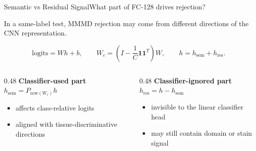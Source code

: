 \documentclass[aspectratio=169,10pt]{beamer}
\begin{document}
\begin{frame}{Semantic vs Residual Signal}{What part of FC-128 drives rejection?}

\vspace{0.02cm}

{\normalsize
In a same-label test, MMMD rejection may come from different directions of the CNN representation.
}

\vspace{-0.12cm}

\begin{center}
\normalsize
\[
\text{logits}=Wh+b,\qquad
W_c=\left(I-\frac{1}{C}\mathbf{1}\mathbf{1}^{T}\right)W,\qquad
h=h_{\mathrm{sem}}+h_{\mathrm{res}}.
\]
\end{center}

\vspace{0.28cm}

\begin{center}
\begin{minipage}{0.94\linewidth}
\begin{columns}[T,totalwidth=\linewidth]

\begin{column}{0.48\linewidth}
\centering
{\large\bfseries Classifier-used part}\\[0.38em]
{\large $h_{\mathrm{sem}}=P_{\mathrm{row}(W_c)}h$}\\[0.22em]
\begin{minipage}{0.88\linewidth}
\begin{itemize}
  \item affects class-relative logits
  \item aligned with tissue-discriminative directions
\end{itemize}
\end{minipage}
\end{column}

\begin{column}{0.48\linewidth}
\centering
{\large\bfseries Classifier-ignored part}\\[0.38em]
{\large $h_{\mathrm{res}}=h-h_{\mathrm{sem}}$}\\[0.22em]
\begin{minipage}{0.88\linewidth}
\begin{itemize}
  \item invisible to the linear classifier head
  \item may still contain domain or stain signal
\end{itemize}
\end{minipage}
\end{column}


\end{columns}
\end{minipage}
\end{center}
\end{frame}
\end{document}
